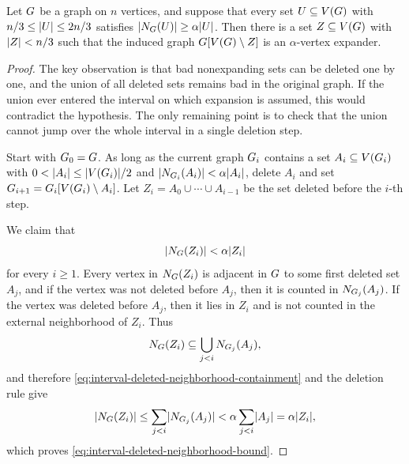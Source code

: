 \begin{lemma}
	\label{lem:interval-expansion-deletion}
	Let \(G\) be a graph on \(n\) vertices, and suppose that every set \(U\subseteq V(G)\) with \(n/3\leq\lvert U\rvert\leq 2n/3\) satisfies \(\lvert N_{G}(U)\rvert\geq\alpha\lvert U\rvert\). Then there is a set \(Z\subseteq V(G)\) with \(\lvert Z\rvert<n/3\) such that the induced graph \(G[V(G)\setminus Z]\) is an \(\alpha\)-vertex expander.
\end{lemma}

\begin{proof}
	The key observation is that bad nonexpanding sets can be deleted one by one, and the union of all deleted sets remains bad in the original graph. If the union ever entered the interval on which expansion is assumed, this would contradict the hypothesis. The only remaining point is to check that the union cannot jump over the whole interval in a single deletion step.

	Start with \(G_0=G\). As long as the current graph \(G_i\) contains a set \(A_i\subseteq V(G_i)\) with \(0<\lvert A_i\rvert\leq \lvert V(G_i)\rvert/2\) and \(\lvert N_{G_i}(A_i)\rvert<\alpha\lvert A_i\rvert\), delete \(A_i\) and set \(G_{i+1}=G_i[V(G_i)\setminus A_i]\). Let \(Z_i=A_0\cup\cdots\cup A_{i-1}\) be the set deleted before the \(i\)-th step.

	We claim that
	\begin{equation}
		\label{eq:interval-deleted-neighborhood-bound}
		\lvert N_{G}(Z_i)\rvert<\alpha\lvert Z_i\rvert
	\end{equation}
	for every \(i\geq 1\). Every vertex in \(N_{G}(Z_i)\) is adjacent in \(G\) to some first deleted set \(A_j\), and if the vertex was not deleted before \(A_j\), then it is counted in \(N_{G_j}(A_j)\). If the vertex was deleted before \(A_j\), then it lies in \(Z_i\) and is not counted in the external neighborhood of \(Z_i\). Thus
	\begin{equation}
		\label{eq:interval-deleted-neighborhood-containment}
		N_{G}(Z_i)\subseteq \bigcup_{j<i}N_{G_j}(A_j),
	\end{equation}
	and therefore \cref{eq:interval-deleted-neighborhood-containment} and the deletion rule give
	\begin{equation}
		\label{eq:interval-deleted-neighborhood-sum}
		\lvert N_{G}(Z_i)\rvert\leq \sum_{j<i}\lvert N_{G_j}(A_j)\rvert<\alpha\sum_{j<i}\lvert A_j\rvert=\alpha\lvert Z_i\rvert,
	\end{equation}
	which proves \cref{eq:interval-deleted-neighborhood-bound}.


\end{proof}
